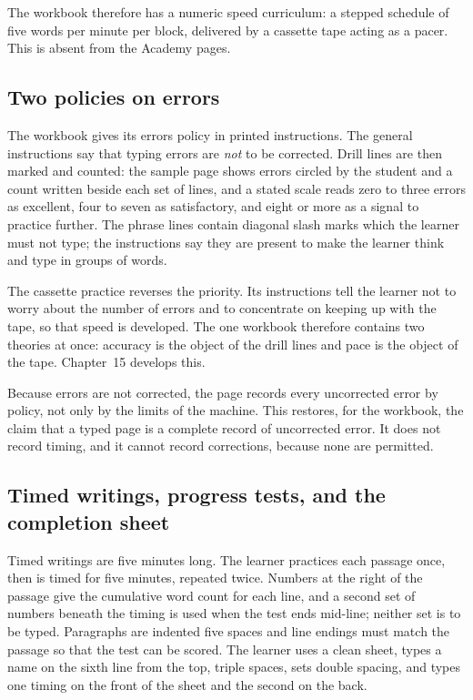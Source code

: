 The workbook therefore has a numeric speed curriculum: a stepped schedule of five words per minute per block, delivered by a cassette tape acting as a pacer. This is absent from the Academy pages.

\subsection{Two policies on errors}

The workbook gives its errors policy in printed instructions. The general instructions say that typing errors are \emph{not} to be corrected. Drill lines are then marked and counted: the sample page shows errors circled by the student and a count written beside each set of lines, and a stated scale reads zero to three errors as excellent, four to seven as satisfactory, and eight or more as a signal to practice further. The phrase lines contain diagonal slash marks which the learner must not type; the instructions say they are present to make the learner think and type in groups of words.

The cassette practice reverses the priority. Its instructions tell the learner not to worry about the number of errors and to concentrate on keeping up with the tape, so that speed is developed. The one workbook therefore contains two theories at once: accuracy is the object of the drill lines and pace is the object of the tape. Chapter~15 develops this.

Because errors are not corrected, the page records every uncorrected error by policy, not only by the limits of the machine. This restores, for the workbook, the claim that a typed page is a complete record of uncorrected error. It does not record timing, and it cannot record corrections, because none are permitted.

\subsection{Timed writings, progress tests, and the completion sheet}

Timed writings are five minutes long. The learner practices each passage once, then is timed for five minutes, repeated twice. Numbers at the right of the passage give the cumulative word count for each line, and a second set of numbers beneath the timing is used when the test ends mid-line; neither set is to be typed. Paragraphs are indented five spaces and line endings must match the passage so that the test can be scored. The learner uses a clean sheet, types a name on the sixth line from the top, triple spaces, sets double spacing, and types one timing on the front of the sheet and the second on the back.

